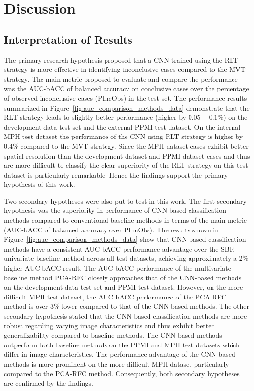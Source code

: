\section{Discussion}
\label{sec:discussion}

\subsection{Interpretation of Results}

The primary research hypothesis proposed that a CNN trained using the RLT strategy
is more effective in identifying inconclusive cases compared to the MVT strategy.
The main metric proposed to evaluate and compare the performance was the
AUC-bACC of balanced accuracy on conclusive cases over the percentage of observed inconclusive cases (PIncObs) in the test set.
The performance results summarized in Figure~\ref{fig:auc_comparison_methods_data} demonstrate 
that the RLT strategy leads to slightly better performance (higher by $0.05-0.1\%$) on the development data test set 
and the external PPMI test dataset.
On the internal MPH test dataset the performance of the CNN using RLT strategy is higher by $0.4\%$ compared to the MVT strategy.
Since the MPH dataset cases exhibit better spatial resolution than the development dataset and PPMI dataset cases
and thus are more difficult to classify 
the clear superiority of the RLT strategy on this test dataset is particularly remarkable.
Hence the findings support the primary hypothesis of this work.

Two secondary hypotheses were also put to test in this work.
The first secondary hypothesis was the superiority in performance of CNN-based classification methods compared to 
conventional baseline methods in terms of the main metric (AUC-bACC of balanced accuracy over PIncObs).
The results shown in Figure~\ref{fig:auc_comparison_methods_data} show that CNN-based classification methods
have a consistent AUC-bACC performance advantage over the SBR univariate baseline method across all test datasets, 
achieving approximately a 2\% higher AUC-bACC result.
The AUC-bACC performance of the multivariate baseline method PCA-RFC closely approaches that of the CNN-based methods 
on the development data test set and PPMI test dataset.
However, on the more difficult MPH test dataset, the AUC-bACC performance of the PCA-RFC method is over 3\% lower
compared to that of the CNN-based methods.
The other secondary hypothesis stated that the CNN-based classification methods are 
more robust regarding varying image characteristics and thus exhibit better generalizability compared to baseline methods.
The CNN-based methods outperform both baseline methods on the PPMI and MPH test datasets which differ in image characteristics.
The performance advantage of the CNN-based methods is more prominent on the more difficult MPH dataset 
particularly compared to the PCA-RFC method.
Consequently, both secondary hypotheses are confirmed by the findings.


